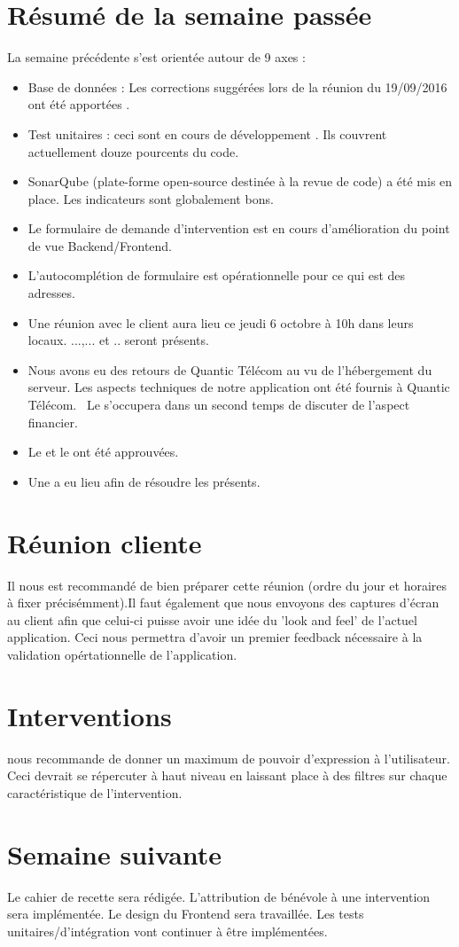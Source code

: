 \documentclass [a4paper] {article}
\begin{document}
\section{Résumé de la semaine passée}
La semaine précédente s'est orientée autour de 9 axes :  
\begin{itemize}
\item Base de données : Les corrections suggérées lors de la réunion du 19/09/2016 ont été apportées .
\item Test unitaires : ceci sont en cours de développement . Ils couvrent actuellement douze pourcents du code.
\item SonarQube (plate-forme open-source destinée à la revue de code) a été mis en place. Les indicateurs sont globalement bons. 
\item Le formulaire de demande d'intervention est en cours d'amélioration du point de vue Backend/Frontend.
\item L'autocomplétion de formulaire est opérationnelle pour ce qui est des adresses.
\item Une réunion avec le client aura lieu ce jeudi 6 octobre à 10h dans leurs locaux. ...,... et .. seront présents.
\item Nous avons eu des retours de Quantic Télécom au vu de l'hébergement du serveur. Les aspects techniques de notre application ont été fournis à Quantic Télécom. \ Le \CP{} s'occupera dans un second temps de discuter de l'aspect financier. 
\item Le \PQ{} et le \PGC{} ont été approuvées.
\item Une \CTFT{} a eu lieu afin de résoudre les \FT{} présents.
\end{itemize} 

\section{Réunion cliente}
Il nous est recommandé de bien préparer cette réunion (ordre du jour et horaires à fixer précisémment).Il faut également que nous envoyons des captures d'écran au client afin que celui-ci puisse avoir une idée du 'look and feel' de l'actuel application. Ceci nous permettra d'avoir un premier feedback nécessaire à la validation opértationnelle de l'application.

\section{Interventions}
\nomTuteurPedago{} nous recommande de donner un maximum de pouvoir d'expression à l'utilisateur. Ceci devrait se répercuter à haut niveau en laissant place à des filtres sur chaque caractéristique de l'intervention. 

\section{Semaine suivante}
Le cahier de recette sera rédigée. L'attribution de bénévole à une intervention sera implémentée. Le design du Frontend sera travaillée. Les tests unitaires/d'intégration vont continuer à être implémentées.


\newpage
\end{document}

